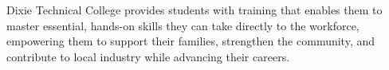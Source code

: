 Dixie Technical College provides students with training that enables them to master essential, hands-on skills they
can take directly to the workforce, empowering them to support their families, strengthen the community, and contribute
to local industry while advancing their careers.
